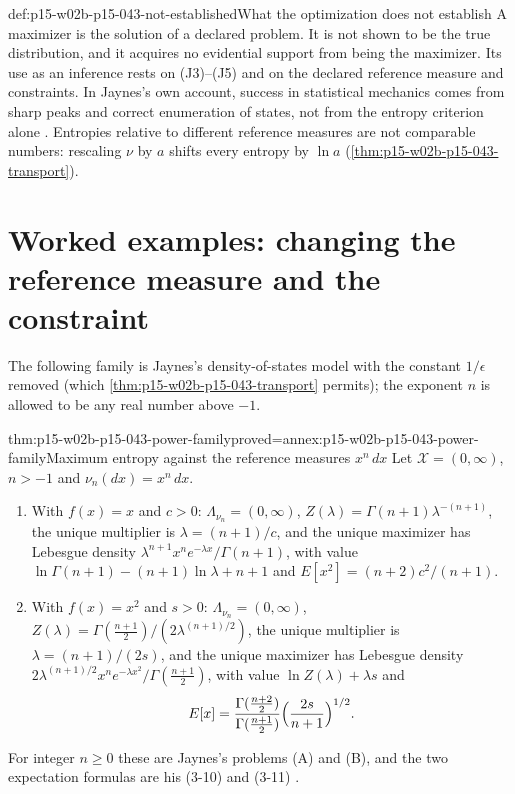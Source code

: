 \begin{hbwarning}{def:p15-w02b-p15-043-not-established}{What the optimization does not establish}
A maximizer is the solution of a declared problem. It is not shown to be
the true distribution, and it acquires no evidential support from being the
maximizer. Its use as an inference rests on (J3)--(J5) and on the declared
reference measure and constraints. In Jaynes's own account, success in
statistical mechanics comes from sharp peaks and correct enumeration of states,
not from the entropy criterion alone \cite[pp.~625--627]{Jaynes1957InformationTheory}.
Entropies relative to different reference measures are not comparable numbers:
rescaling \(\nu\) by \(a\) shifts every entropy by \(\ln a\)
(\cref{thm:p15-w02b-p15-043-transport}).
\end{hbwarning}

\section{Worked examples: changing the reference measure and the constraint}
\label{sec:p15-w02b-p15-043-examples}

The following family is Jaynes's density-of-states model with the constant
\(1/\epsilon\) removed (which \cref{thm:p15-w02b-p15-043-transport} permits);
the exponent \(n\) is allowed to be any real number above \(-1\).

\begin{hbtheorem}{thm:p15-w02b-p15-043-power-family}{proved=annex:p15-w02b-p15-043-power-family}{Maximum entropy against the reference measures \(x^n\,dx\)}
Let \(\mathcal X=(0,\infty)\), \(n>-1\) and \(\nu_n(dx)=x^n\,dx\).
\begin{enumerate}
\item With \(f(x)=x\) and \(c>0\): \(\Lambda_{\nu_n}=(0,\infty)\),
\(Z(\lambda)=\Gamma(n+1)\lambda^{-(n+1)}\), the unique multiplier is
\(\lambda=(n+1)/c\), and the unique maximizer has Lebesgue density
\(\lambda^{n+1}x^ne^{-\lambda x}/\Gamma(n+1)\), with value
\(\ln\Gamma(n+1)-(n+1)\ln\lambda+n+1\) and
\(E[x^2]=(n+2)c^2/(n+1)\).
\item With \(f(x)=x^2\) and \(s>0\): \(\Lambda_{\nu_n}=(0,\infty)\),
\(Z(\lambda)=\Gamma(\tfrac{n+1}2)/(2\lambda^{(n+1)/2})\), the unique
multiplier is \(\lambda=(n+1)/(2s)\), and the unique maximizer has
Lebesgue density \(2\lambda^{(n+1)/2}x^ne^{-\lambda x^2}/\Gamma(\tfrac{n+1}2)\),
with value \(\ln Z(\lambda)+\lambda s\) and
\[
 E[x]=\frac{\Gamma(\tfrac{n+2}2)}{\Gamma(\tfrac{n+1}2)}
      \Bigl(\frac{2s}{n+1}\Bigr)^{1/2}.
\]
\end{enumerate}
For integer \(n\geq0\) these are Jaynes's problems (A) and (B), and the two
expectation formulas are his (3-10) and (3-11)
\cite[p.~625]{Jaynes1957InformationTheory}.
\end{hbtheorem}

